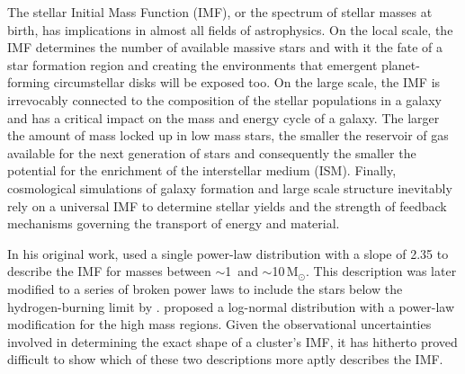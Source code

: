 \documentclass{aa}
\newcommand{\msune}{M$_\odot$}
\newcommand{\s}{$\sim$}
\begin{document}
The stellar Initial Mass Function (IMF), or the spectrum of stellar masses at birth, has implications in almost all fields of astrophysics.
On the local scale, the IMF determines the number of available massive stars and with it the fate of a star formation region and creating the environments that emergent planet-forming circumstellar disks will be exposed too.
On the large scale, the IMF is irrevocably connected to the composition of the stellar populations in a galaxy and has a critical impact on the mass and energy cycle of a galaxy.
The larger the amount of mass locked up in low mass stars, the smaller the reservoir of gas available for the next generation of stars and consequently the smaller the potential for the enrichment of the interstellar medium (ISM).
Finally, cosmological simulations of galaxy formation and large scale structure inevitably rely on a universal IMF to determine stellar yields and the strength of feedback mechanisms governing the transport of energy and material.

In his original work, \citet{salpeter1955} used a single power-law distribution with a slope of 2.35 to describe the IMF for masses between \s1\ and \s10\,\msune.
This description was later modified to a series of broken power laws to include the stars below the hydrogen-burning limit by \citet{kroupa2001}\@.
\citet{chabrier2003, Chabrier2005} proposed a log-normal distribution with a power-law modification for the high mass regions.
Given the observational uncertainties involved in determining the exact shape of a cluster's IMF, it has hitherto proved difficult to show which of these two descriptions more aptly describes the IMF\@.
\end{document}
